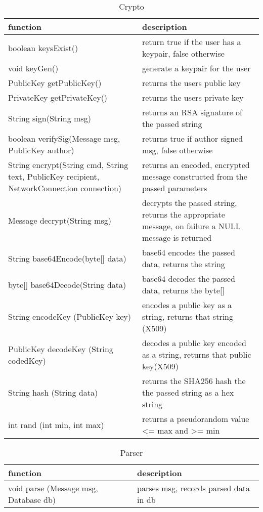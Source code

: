 \begin{table}[h]
    \centering
    \begin{tabular}{ll}
    function                              & description\\ \hline
    boolean keysExist()                   & return true if the user has a keypair, false otherwise\\
    void keyGen()                         & generate a keypair for the user\\
    PublicKey getPublicKey()              & returns the users public key\\
    PrivateKey getPrivateKey()            & returns the users private key\\
    String sign(String msg)               & returns an RSA signature of the passed string\\
    boolean verifySig(Message msg, PublicKey author) & returns true if author signed msg, false otherwise\\
    String encrypt(String cmd, String text, PublicKey recipient, NetworkConnection connection) & returns an encoded, encrypted message constructed from the passed parameters\\
    Message decrypt(String msg)           & decrypts the passed string, returns the appropriate message, on failure a NULL message is returned\\
    String base64Encode(byte[] data)      & base64 encodes the passed data, returns the string\\
    byte[] base64Decode(String data)      & base64 decodes the passed data, returns the byte[]\\
    String encodeKey (PublicKey key)      & encodes a public key as a string, returns that string (X509)\\
    PublicKey decodeKey (String codedKey) & decodes a public key encoded as a string, returns that public key(X509)\\
    String hash (String data)             & returns the SHA256 hash the the passed string as a hex string\\
    int rand (int min, int max)           & returns a pseudorandom value <= max and >= min\\
    \end{tabular}
    \caption{Crypto}
\end{table}

\begin{table}[h]
    \centering
    \begin{tabular}{ll}
    function                              & description\\ \hline
    void parse (Message msg, Database db) & parses msg, records parsed data in db\\
    \end{tabular}
    \caption{Parser}
\end{table}

